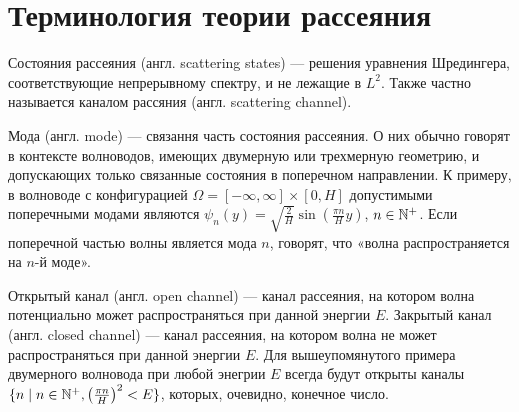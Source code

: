 \section{Терминология теории рассеяния}
Состояния рассеяния (англ. scattering states) — решения уравнения Шредингера, соответствующие непрерывному спектру, и не лежащие в $L^2$. Также частно называется каналом рассяния (англ. scattering channel).

Мода (англ. mode) — связання часть состояния рассеяния. О них обычно говорят в контексте волноводов, имеющих двумерную или трехмерную геометрию, и допускающих только связанные состояния в поперечном направлении. К примеру, в волноводе с конфигурацией $\Omega = [-\infty, \infty] \times [0, H]$ допустимыми поперечными модами являются $\psi_n(y) = \sqrt{\frac{2}{H}} \sin(\frac{\pi n}{H} y)$, $n \in \mathbb{N}^+$. Если поперечной частью волны является мода $n$, говорят, что «волна распространяется на $n$-й моде».

Открытый канал (англ. open channel) — канал рассеяния, на котором волна потенциально может распространяться при данной энергии $E$. Закрытый канал (англ. closed channel) — канал рассеяния, на котором волна не может распространяться при данной энергии $E$. Для вышеупомянутого примера двумерного волновода при любой энегрии $E$ всегда будут открыты каналы $\{n \mid n \in \mathbb{N}^+, \left(\frac{\pi n}{H}\right)^2 < E \}$, которых, очевидно, конечное число.

